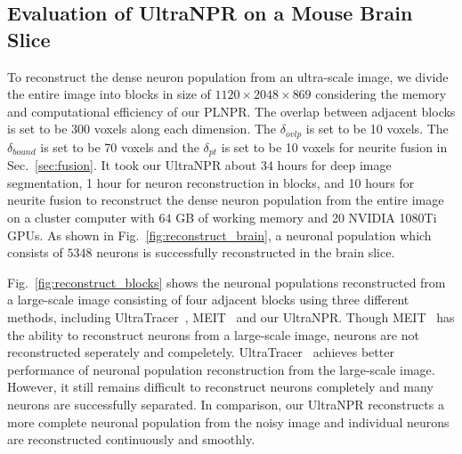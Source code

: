 \subsection{Evaluation of UltraNPR on a Mouse Brain Slice}
\label{sec:exp_UltraNPR}

To reconstruct the dense neuron population from an ultra-scale image, we divide the entire image into blocks in size of $1120\times 2048\times 869$ considering the memory and computational efficiency of our PLNPR.
%
The overlap between adjacent blocks is set to be $300$ voxels along each dimension. 
The $\delta_{ovlp}$ is set to be 10 voxels.
The $\delta_{bound}$ is set to be 70 voxels and the $\delta_{pt}$ is set to be 10 voxels for neurite fusion in Sec.~\ref{sec:fusion}.
%
It took our UltraNPR about 34 hours for deep image segmentation, 1 hour for neuron reconstruction in blocks, and 10 hours for neurite fusion to reconstruct the dense neuron population from the entire image on a cluster computer with $64$ GB of working memory and 20 NVIDIA 1080Ti GPUs.
%
As shown in Fig.~\ref{fig:reconstruct_brain}, a neuronal population which consists of $5348$ neurons is successfully reconstructed in the brain slice.


Fig.~\ref{fig:reconstruct_blocks} shows the neuronal populations reconstructed from a large-scale image consisting of four adjacent blocks using three different methods, including UltraTracer~\cite{Peng2017}, MEIT~\cite{Wang2018} and our UltraNPR.
Though MEIT~\cite{Wang2018} has the ability to reconstruct neurons from a large-scale image, neurons are not reconstructed seperately and compeletely.
UltraTracer~\cite{Peng2017} achieves better performance of neuronal population reconstruction from the large-scale image. However, it still remains difficult to reconstruct neurons completely and many neurons are successfully separated.
In comparison, our UltraNPR reconstructs a more complete neuronal population from the noisy image and individual neurons are reconstructed continuously and smoothly.

